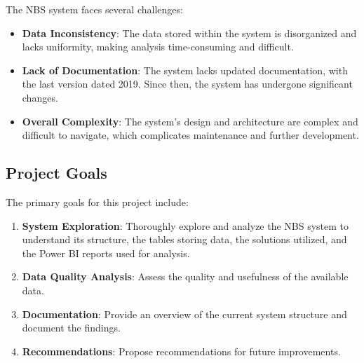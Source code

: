 The NBS system faces several challenges:
\begin{itemize}
	\item \textbf{Data Inconsistency}: The data stored within the system is disorganized and lacks uniformity, making analysis time-consuming and difficult.
	\item \textbf{Lack of Documentation}: The system lacks updated documentation, with the last version dated 2019. Since then, the system has undergone significant changes.
	\item \textbf{Overall Complexity}: The system's design and architecture are complex and difficult to navigate, which complicates maintenance and further development.
\end{itemize}

\subsection{Project Goals}
The primary goals for this project include:
\begin{enumerate}
	\item \textbf{System Exploration}: Thoroughly explore and analyze the NBS system to understand its structure, the tables storing data, the solutions utilized, and the Power BI reports used for analysis.
	\item \textbf{Data Quality Analysis}: Assess the quality and usefulness of the available data.
	\item \textbf{Documentation}: Provide an overview of the current system structure and document the findings.
	\item \textbf{Recommendations}: Propose recommendations for future improvements.
\end{enumerate}